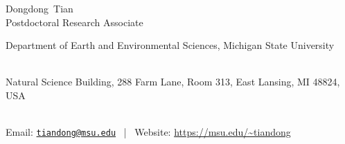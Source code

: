 \documentclass[11pt, a4paper]{article}
\makeatletter
\newcommand{\FirstName}{Dongdong}
\newcommand{\LastName}{Tian}
\newcommand{\MyName}{\FirstName\ \LastName}
\newcommand{\MyRole}{Postdoctoral Research Associate}
\newcommand{\Email}{tiandong@msu.edu}
\newcommand{\Website}{https://msu.edu/~tiandong}
\newcommand{\Affiliation}{
    Department of Earth and Environmental Sciences,
    Michigan State University
}
\newcommand{\Address}{
    Natural Science Building, 288 Farm Lane, Room 313, East Lansing, MI 48824, USA
}
\newcommand{\makefield}[2]{\makebox[1.5em]{\color{MarkerColour!80!black}#1} #2}
\makeatother
\begin{document}
\thispagestyle{empty}

\begin{center}
    {\fontsize{36pt}{0}\selectfont \MyName}
    \\[0.5cm]
    {\fontsize{16pt}{0}\selectfont \MyRole}
    \\[0.3cm]
    {\fontsize{10pt}{0}\selectfont
        \Affiliation
        \\[0.2cm]
        \Address
        \\[0.08cm]
        Email: \href{mailto:\Email}{\texttt{\Email}}
        \, | \,
        Website: \url{\Website}
    }
\end{center}











%
\end{document}
